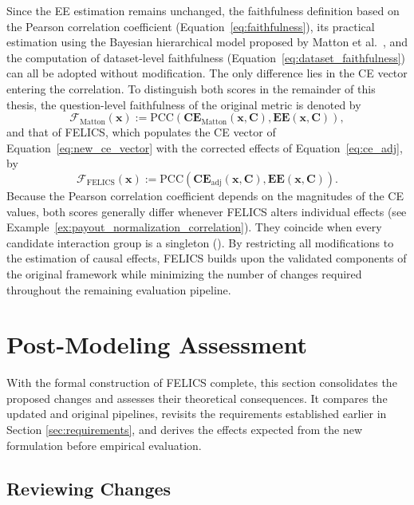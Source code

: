 Since the EE estimation remains unchanged, the faithfulness definition based on the Pearson correlation coefficient (Equation~\ref{eq:faithfulness}), its practical estimation using the Bayesian hierarchical model proposed by Matton et al.~\cite{mattonWalkTalkMeasuring2024}, and the computation of dataset-level faithfulness (Equation~\ref{eq:dataset_faithfulness}) can all be adopted without modification. The only difference lies in the CE vector entering the correlation. To distinguish both scores in the remainder of this thesis, the question-level faithfulness of the original metric is denoted by
\begin{equation}
	\label{eq:faithfulness_matton}
	\mathcal{F}_{\mathrm{Matton}}(\mathbf{x}) := \mathrm{PCC}\left(\mathbf{CE}_{\mathrm{Matton}}(\mathbf{x},\mathbf{C}),\mathbf{EE}(\mathbf{x},\mathbf{C})\right),
\end{equation}
and that of FELICS, which populates the CE vector of Equation~\ref{eq:new_ce_vector} with the corrected effects of Equation~\ref{eq:ce_adj}, by
\begin{equation}
	\label{eq:faithfulness_felics}
	\mathcal{F}_{\mathrm{FELICS}}(\mathbf{x}) := \mathrm{PCC}\left(\mathbf{CE}_{\mathrm{adj}}(\mathbf{x},\mathbf{C}),\mathbf{EE}(\mathbf{x},\mathbf{C})\right).
\end{equation}
Because the Pearson correlation coefficient depends on the magnitudes of the CE values, both scores generally differ whenever FELICS alters individual effects (see Example~\ref{ex:payout_normalization_correlation}). They coincide when every candidate interaction group is a singleton (). By restricting all modifications to the estimation of causal effects, FELICS builds upon the validated components of the original framework while minimizing the number of changes required throughout the remaining evaluation pipeline.

\section{Post-Modeling Assessment}
With the formal construction of FELICS complete, this section consolidates the proposed changes and assesses their theoretical consequences. It compares the updated and original pipelines, revisits the requirements established earlier in Section \ref{sec:requirements}, and derives the effects expected from the new formulation before empirical evaluation.

\subsection{Reviewing Changes}

